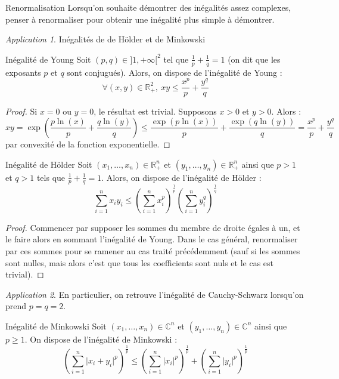 \documentclass[french]{book}
\newcommand{\R}{\mathbb{R}}
\newcommand{\C}{\mathbb{C}}
\theoremstyle{plain}
\theoremstyle{definition}
\theoremstyle{remark}
\newtheorem*{app}{Application}
\begin{document}
\begin{AS}{Renormalisation} Lorsqu'on souhaite démontrer des inégalités assez complexes, penser à renormaliser pour obtenir une inégalité plus simple à démontrer.
\end{AS}
\begin{app}
	Inégalités de de Hölder et de Minkowski 
\end{app}

\begin{AS}{Inégalité de Young}
	Soit $(p,q)\in]1,+\infty[^2$ tel que $\displaystyle\frac{1}{p}+\frac{1}{q}=1$ (on dit que les exposants $p$ et $q$ sont conjugués). Alors, on dispose de l'inégalité de Young : $$\forall (x,y)\in\R_+^2,\ xy\leqslant\frac{x^p}{p}+\frac{y^q}{q}$$
\end{AS}
\begin{proof}
	Si $x=0$ ou $y=0$, le résultat est trivial. Supposons $x>0$ et $y>0$. Alors : $$xy=\exp\left(\frac{p\ln(x)}{p}+\frac{q\ln(y)}{q}\right)\leqslant\frac{\exp(p\ln(x))}{p}+\frac{\exp(q\ln(y))}{q}=\frac{x^p}{p}+\frac{y^q}{q}$$ par convexité de la fonction exponentielle.
\end{proof}
\begin{AS}{Inégalité de Hölder}
	Soit $(x_1,\ldots,x_n)\in\R_+^n$ et $(y_1,\ldots,y_n)\in\R_+^n$ ainsi que $p>1$ et $q>1$ tels que $\displaystyle\frac{1}{p}+\frac{1}{q}=1$. Alors, on dispose de l'inégalité de Hölder : $$\sum_{i=1}^{n}x_iy_i\leqslant\left(\sum_{i=1}^{n}x_i^p\right)^{\frac{1}{p}}\left(\sum_{i=1}^{n}y_i^q\right)^{\frac{1}{q}}$$
\end{AS}
\begin{proof}
	Commencer par supposer les sommes du membre de droite égales à un, et le faire alors en sommant l'inégalité de Young. Dans le cas général, renormaliser par ces sommes pour se ramener au cas traité précédemment (sauf si les sommes sont nulles, mais alors c'est que tous les coefficients sont nuls et le cas est trivial).
\end{proof}
\begin{app}
	En particulier, on retrouve l'inégalité de Cauchy-Schwarz lorsqu'on prend $p=q=2$.
\end{app}
\begin{AS}{Inégalité de Minkowski}
	Soit $(x_1,\ldots,x_n)\in\C^n$ et $(y_1,\ldots,y_n)\in\C^n$ ainsi que $p\geqslant 1$. On dispose de l'inégalité de Minkowski : $$\left(\sum_{i=1}^{n}\lvert x_i+y_i\rvert^p\right)^{\frac{1}{p}}\leqslant\left(\sum_{i=1}^{n}\lvert x_i\rvert^p\right)^{\frac{1}{p}}+\left(\sum_{i=1}^{n}\lvert y_i\rvert^p\right)^{\frac{1}{p}}$$
\end{AS}
\end{document}
